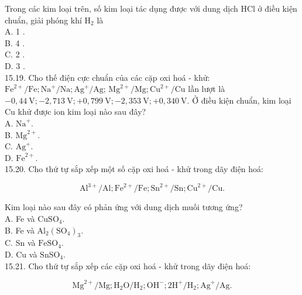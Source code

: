 \documentclass[10pt]{article}
\begin{document}
Trong các kim loại trên, số kim loại tác dụng được với dung dịch HCl ở điều kiện chuẩn, giải phóng khí $\mathrm{H}_{2}$ là\\
A. 1 .\\
B. 4 .\\
C. 2 .\\
D. 3 .\\
15.19. Cho thế điện cực chuẩn của các cặp oxi hoá - khử: $\mathrm{Fe}^{2+} / \mathrm{Fe} ; \mathrm{Na}^{+} / \mathrm{Na} ; \mathrm{Ag}^{+} / \mathrm{Ag}$; $\mathrm{Mg}^{2+} / \mathrm{Mg} ; \mathrm{Cu}^{2+} / \mathrm{Cu}$ lần lượt là $-0,44 \mathrm{~V} ;-2,713 \mathrm{~V} ;+0,799 \mathrm{~V} ;-2,353 \mathrm{~V} ;+0,340 \mathrm{~V}$. Ở điều kiện chuẩn, kim loại Cu khử được ion kim loại nào sau đây?\\
A. $\mathrm{Na}^{+}$.\\
B. $\mathrm{Mg}^{2+}$.\\
C. $\mathrm{Ag}^{+}$.\\
D. $\mathrm{Fe}^{2+}$.\\
15.20. Cho thứ tự sắp xếp một số cặp oxi hoá - khử trong dãy điện hoá:

$$
\mathrm{Al}^{3+} / \mathrm{Al} ; \mathrm{Fe}^{2+} / \mathrm{Fe} ; \mathrm{Sn}^{2+} / \mathrm{Sn} ; \mathrm{Cu}^{2+} / \mathrm{Cu} .
$$

Kim loại nào sau đây có phản ứng với dung dịch muối tương ứng?\\
A. Fe và $\mathrm{CuSO}_{4}$.\\
B. Fe và $\mathrm{Al}_{2}\left(\mathrm{SO}_{4}\right)_{3}$.\\
C. Sn và $\mathrm{FeSO}_{4}$.\\
D. Cu và $\mathrm{SnSO}_{4}$.\\
15.21. Cho thứ tự sắp xếp các cặp oxi hoá - khử trong dãy điện hoá:

$$
\mathrm{Mg}^{2+} / \mathrm{Mg} ; \mathrm{H}_{2} \mathrm{O} / \mathrm{H}_{2} ; \mathrm{OH}^{-} ; 2 \mathrm{H}^{+} / \mathrm{H}_{2} ; \mathrm{Ag}^{+} / \mathrm{Ag} .
$$
\end{document}
